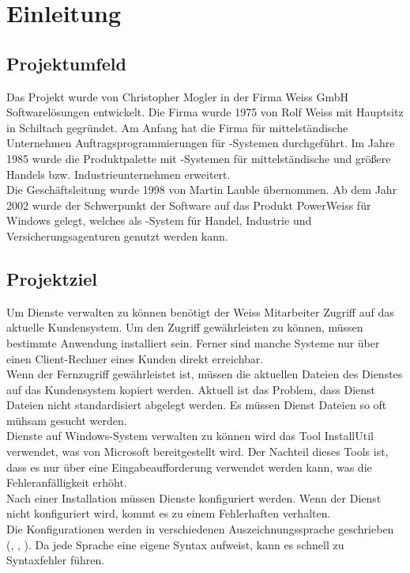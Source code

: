 \section{Einleitung}
\label{sec:Einleitung}

\subsection{Projektumfeld} 
\label{sec:Projektumfeld}
Das Projekt wurde von Christopher Mogler in der Firma Weiss GmbH Softwarelösungen
entwickelt. Die Firma wurde 1975 von Rolf Weiss mit Hauptsitz in Schiltach gegründet. Am Anfang hat die Firma für mittelständische Unternehmen Auftragsprogrammierungen für
-Systemen durchgeführt. Im Jahre 1985 wurde die Produktpalette mit -Systemen für
mittelständische und größere Handels bzw. Industrieunternehmen erweitert. \\
Die Geschäftsleitung wurde 1998 von Martin Lauble übernommen. Ab dem Jahr 2002 wurde der
Schwerpunkt der Software auf das Produkt PowerWeiss für Windows gelegt, welches als
-System für Handel, Industrie und Versicherungsagenturen genutzt werden kann.

\subsection{Projektziel} 
\label{sec:Projektziel}
Um Dienste verwalten zu können benötigt der Weiss Mitarbeiter Zugriff auf das aktuelle Kundensystem. Um den Zugriff gewährleisten zu können, müssen bestimmte Anwendung installiert sein. 
Ferner sind manche Systeme nur über einen Client-Rechner eines Kunden direkt erreichbar. \\
Wenn der Fernzugriff gewährleistet ist, müssen die aktuellen Dateien des Dienstes auf das Kundensystem kopiert werden. Aktuell ist das Problem, dass Dienst Dateien nicht standardisiert abgelegt werden. 
Es müssen Dienst Dateien so oft mühsam gesucht werden. \\
Dienste auf Windows-System verwalten zu können wird das Tool InstallUtil verwendet, was von Microsoft bereitgestellt wird. 
Der Nachteil dieses Tools ist, dass es nur über eine Eingabeaufforderung verwendet werden kann, was die Fehleranfälligkeit erhöht. \\
Nach einer Installation müssen Dienste konfiguriert werden. Wenn der Dienst nicht konfiguriert wird, kommt es zu einem Fehlerhaften verhalten. \\
Die Konfigurationen werden in verschiedenen Auszeichnungssprache geschrieben (\zB {}, , ). Da jede Sprache eine eigene Syntax aufweist, kann es schnell zu Syntaxfehler führen. 


